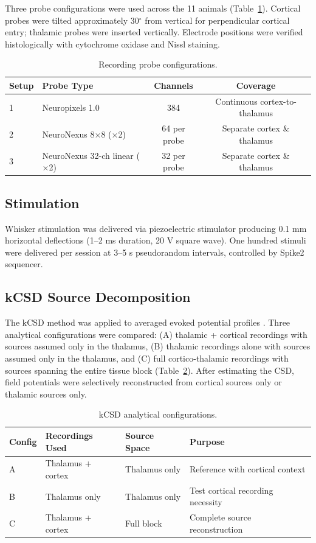 \documentclass[12pt]{article}
\begin{document}
Three probe configurations were used across the 11 animals (Table~\ref{tab:probes}). Cortical probes were tilted approximately 30$^\circ$ from vertical for perpendicular cortical entry; thalamic probes were inserted vertically. Electrode positions were verified histologically with cytochrome oxidase and Nissl staining.

\begin{table}[htbp]
\centering
\caption{Recording probe configurations.}
\label{tab:probes}
\begin{tabular}{llcc}
\toprule
Setup & Probe Type & Channels & Coverage \\
\midrule
1 & Neuropixels 1.0 & 384 & Continuous cortex-to-thalamus \\
2 & NeuroNexus 8$\times$8 ($\times$2) & 64 per probe & Separate cortex \& thalamus \\
3 & NeuroNexus 32-ch linear ($\times$2) & 32 per probe & Separate cortex \& thalamus \\
\bottomrule
\end{tabular}
\end{table}

\subsection{Stimulation}

Whisker stimulation was delivered via piezoelectric stimulator producing 0.1 mm horizontal deflections (1--2 ms duration, 20 V square wave). One hundred stimuli were delivered per session at 3--5 s pseudorandom intervals, controlled by Spike2 sequencer.

\subsection{kCSD Source Decomposition}

The kCSD method was applied to averaged evoked potential profiles \citep{potworowski2012kcsd}. Three analytical configurations were compared: (A) thalamic + cortical recordings with sources assumed only in the thalamus, (B) thalamic recordings alone with sources assumed only in the thalamus, and (C) full cortico-thalamic recordings with sources spanning the entire tissue block (Table~\ref{tab:configs}). After estimating the CSD, field potentials were selectively reconstructed from cortical sources only or thalamic sources only.

\begin{table}[htbp]
\centering
\caption{kCSD analytical configurations.}
\label{tab:configs}
\begin{tabular}{llll}
\toprule
Config & Recordings Used & Source Space & Purpose \\
\midrule
A & Thalamus + cortex & Thalamus only & Reference with cortical context \\
B & Thalamus only & Thalamus only & Test cortical recording necessity \\
C & Thalamus + cortex & Full block & Complete source reconstruction \\
\bottomrule
\end{tabular}
\end{table}
\end{document}
